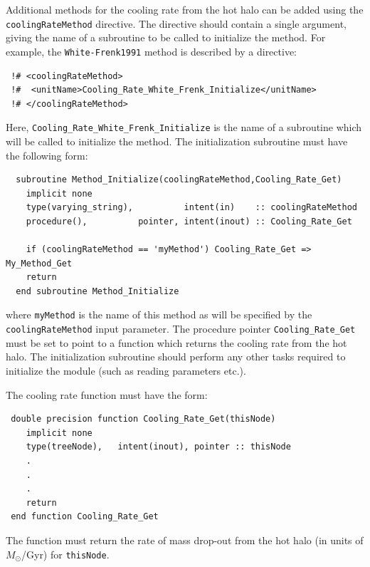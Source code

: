 Additional methods for the cooling rate from the hot halo can be added using the {\tt coolingRateMethod} directive. The directive should contain a single argument, giving the name of a subroutine to be called to initialize the method. For example, the {\tt White-Frenk1991} method is described by a directive:
\begin{verbatim}
 !# <coolingRateMethod>
 !#  <unitName>Cooling_Rate_White_Frenk_Initialize</unitName>
 !# </coolingRateMethod>
\end{verbatim}
Here, {\tt Cooling\_Rate\_White\_Frenk\_Initialize} is the name of a subroutine which will be called to initialize the method. The initialization subroutine must have the following form:
\begin{verbatim}
  subroutine Method_Initialize(coolingRateMethod,Cooling_Rate_Get)
    implicit none
    type(varying_string),          intent(in)    :: coolingRateMethod
    procedure(),          pointer, intent(inout) :: Cooling_Rate_Get
    
    if (coolingRateMethod == 'myMethod') Cooling_Rate_Get => My_Method_Get
    return
  end subroutine Method_Initialize
\end{verbatim}
where {\tt myMethod} is the name of this method as will be specified by the {\tt coolingRateMethod} input parameter. The procedure pointer {\tt Cooling\_Rate\_Get} must be set to point to a function which returns the cooling rate from the hot halo. The initialization subroutine should perform any other tasks required to initialize the module (such as reading parameters etc.).

The cooling rate function must have the form:
\begin{verbatim}
 double precision function Cooling_Rate_Get(thisNode)
    implicit none
    type(treeNode),   intent(inout), pointer :: thisNode
    .
    .
    .
    return
 end function Cooling_Rate_Get
\end{verbatim}
The function must return the rate of mass drop-out from the hot halo (in units of $M_\odot$/Gyr) for {\tt thisNode}. 

